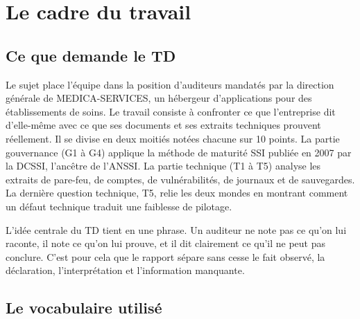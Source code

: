 \documentclass[11pt,a4paper]{article}
\begin{document}


\tableofcontents
\clearpage

\section{Le cadre du travail}

\subsection{Ce que demande le TD}

Le sujet place l'équipe dans la position d'auditeurs mandatés par la direction générale de MEDICA-SERVICES, un hébergeur d'applications pour des établissements de soins. Le travail consiste à confronter ce que l'entreprise dit d'elle-même avec ce que ses documents et ses extraits techniques prouvent réellement. Il se divise en deux moitiés notées chacune sur 10 points. La partie gouvernance (G1 à G4) applique la méthode de maturité SSI publiée en 2007 par la DCSSI, l'ancêtre de l'ANSSI. La partie technique (T1 à T5) analyse les extraits de pare-feu, de comptes, de vulnérabilités, de journaux et de sauvegardes. La dernière question technique, T5, relie les deux mondes en montrant comment un défaut technique traduit une faiblesse de pilotage.

L'idée centrale du TD tient en une phrase. Un auditeur ne note pas ce qu'on lui raconte, il note ce qu'on lui prouve, et il dit clairement ce qu'il ne peut pas conclure. C'est pour cela que le rapport sépare sans cesse le fait observé, la déclaration, l'interprétation et l'information manquante.

\subsection{Le vocabulaire utilisé}
\end{document}
